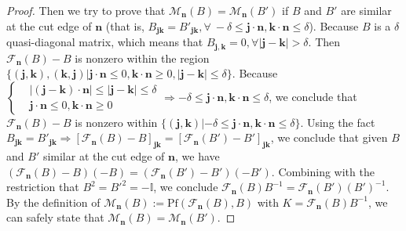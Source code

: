 \begin{proof}
Then we try to prove that $\mathcal{M}_{\mathbf{n}}(B)= \mathcal{M}_{\mathbf{n}}(B')$ if $B$ and $B'$ are similar at the cut edge of $\mathbf{n}$ (that is, $B_{\mathbf j \mathbf k} = B'_{\mathbf j\mathbf k}, \forall~ -\delta\leq \mathbf j\cdot \mathbf{n},\mathbf{k} \cdot \mathbf{n} \leq \delta$). 
    Because $B$ is a $\delta$ quasi-diagonal matrix, which means that $B_{\mathbf{j}, \mathbf{k}} = 0, \forall |\mathbf{j} - \mathbf{k}|>\delta $. Then  $\mathcal{F}_{\mathbf{n}}(B) - B$ is nonzero within the region $\{(\mathbf{j}, \mathbf{k}),(\mathbf{k}, \mathbf{j})|\mathbf{j}\cdot \mathbf{n} \leq 0, \mathbf{k} \cdot \mathbf{n}\geq 0,|\mathbf{j} - \mathbf{k}|\leq \delta\}$. 
    Because $ \left\{\begin{aligned}&|(\mathbf{j} - \mathbf{k}) \cdot \mathbf{n}| \leq |\mathbf{j} - \mathbf{k}| \leq \delta   \\
        &\mathbf{j}\cdot \mathbf{n} \leq 0,\mathbf{k} \cdot \mathbf{n}\geq 0 
        \end{aligned}\right. \Rightarrow -\delta\leq \mathbf j\cdot \mathbf{n},\mathbf{k} \cdot \mathbf{n} \leq \delta$, we conclude that $\mathcal{F}_{\mathbf{n}}(B) - B$ is nonzero within $\{(\mathbf{j}, \mathbf{k})|-\delta\leq \mathbf j\cdot \mathbf{n},\mathbf{k} \cdot \mathbf{n} \leq \delta\}$.
        Using the fact $B_{\mathbf j \mathbf k} = B'_{\mathbf j \mathbf k} \Rightarrow [\mathcal{F}_{\mathbf n}(B) - B]_{\mathbf j \mathbf k} =[\mathcal{F}_{\mathbf n}(B') - B']_{\mathbf j \mathbf k}$, we conclude that given $B$ and $B'$ similar at the cut edge of $\mathbf{n}$, we have $(\mathcal{F}_{\mathbf{n}}(B) - B)(-B) = (\mathcal{F}_{\mathbf{n}}(B') - B')(-B') $. Combining with the restriction that $B^2= B'^2 = - \mathbb{I}$, we conclude $\mathcal{F}_{\mathbf{n}}(B) B^{-1} = \mathcal{F}_{\mathbf{n}}(B')(B')^{-1}$. By the definition of $\mathcal{M}_{\mathbf{n}}(B) :=  \text{Pf}(\mathcal{F}_{\mathbf n}(B),B) $ with $K =\mathcal{F}_{\mathbf{n}}(B) B^{-1}  $, we can safely state that $\mathcal{M}_{\mathbf{n}}(B)= \mathcal{M}_{\mathbf{n}}(B')$.
    

\end{proof}
